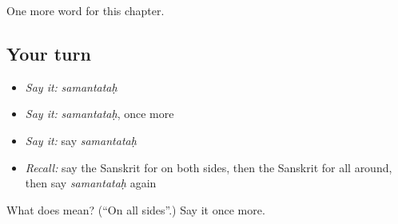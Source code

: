 \begin{grammarlens}[title={What you've built}]
One more word for this chapter.
\end{grammarlens}

\subsection*{Your turn}
\begin{itemize}
\raggedright
  \item \emph{Say it:} \emph{samantataḥ}
  \item \emph{Say it:} \emph{samantataḥ}, once more
  \item \emph{Say it:} say \emph{samantataḥ}
  \item \emph{Recall:} say the Sanskrit for on both sides, then the Sanskrit for all around, then say \emph{samantataḥ} again
\end{itemize}

\begin{tcolorbox}[breakable,colback=teal!4,colframe=teal!35!black,title={Before you move on}]
What does  mean? (\textquotedblleft{}On all sides\textquotedblright{}.) Say it once more.
\end{tcolorbox}
